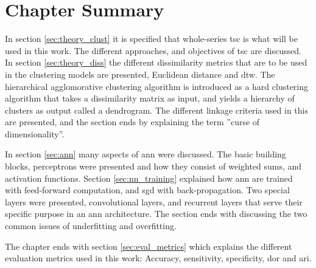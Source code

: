 \section{Chapter Summary}

In section \ref{sec:theory_clust} it is specified that whole-series \acrshort{tsc} is what will be used in this work. The different approaches, and objectives of \acrshort{tsc} are discussed. In section \ref{sec:theory_diss} the different dissimilarity metrics that are to be used in the clustering models are presented, Euclidean distance and \acrshort{dtw}. The hierarchical agglomorative clustering algorithm is introduced as a hard clustering algorithm that takes a dissimilarity matrix as input, and yields a hierarchy of clusters as output called a dendrogram. The different linkage criteria used in this are presented, and the section ends by explaining the term ''curse of dimensionality''. \bigskip

In section \ref{sec:ann} many aspects of \acrshort{ann} were discussed. The basic building blocks, perceptrons were presented and how they consist of weighted sums, and activation functions. Section \ref{sec:nn_training} explained how \acrshort{ann} are trained with feed-forward computation, and \acrshort{sgd} with back-propagation. Two special layers were presented, convolutional layers, and recurrent layers that serve their specific purpose in an \acrshort{ann} architecture. The section ends with discussing the two common issues of underfitting and overfitting. \bigskip
 
The chapter ends with section \ref{sec:eval_metrics} which explains the different evaluation metrics used in this work: Accuracy, sensitivity, specificity, \acrshort{dor} and \acrshort{ari}.
